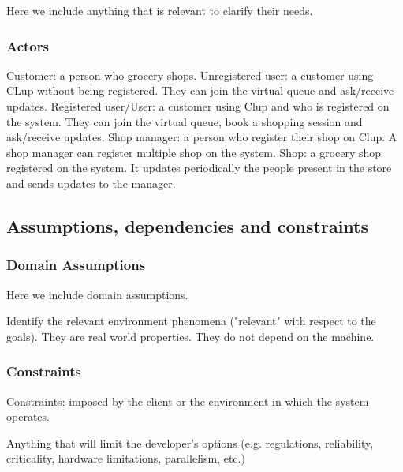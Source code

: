 Here we include anything that is relevant to clarify their needs.

\subsubsection{Actors}
\label{subsubsect:actors}

Customer: a person who grocery shops.
Unregistered user: a customer using CLup without being registered. They can join the virtual queue and ask/receive updates.
Registered user/User: a customer using Clup and who is registered on the system. They can join the virtual queue, book a shopping session and ask/receive updates.
Shop manager: a person who register their shop on Clup. A shop manager can register multiple shop on the system.
Shop: a grocery shop registered on the system. It updates periodically the people present in the store and sends updates to the manager.

\subsection{Assumptions, dependencies and constraints}
\label{subsect:assumptionsdependenciescostraints}

\subsubsection{Domain Assumptions}
\label{subsubsect:domainassumptions}

Here we include domain assumptions.

Identify the relevant environment phenomena ("relevant" with respect to the goals). They are real world properties. They do not depend on the machine.

\subsubsection{Constraints}
\label{subsubsect:contraints}

Constraints: imposed by the client or the environment in which the system operates. 

Anything that will limit the developer’s options (e.g. regulations, reliability, criticality, hardware limitations, parallelism, etc.)

